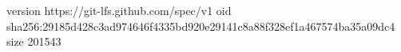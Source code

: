 version https://git-lfs.github.com/spec/v1
oid sha256:29185d428c3ad974646f4335bd920e29141c8a88f328ef1a467574ba35a09dc4
size 201543
